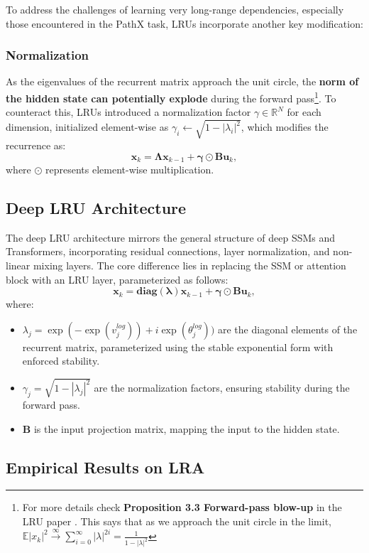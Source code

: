 \documentclass[12pt,a4paper]{report}
\begin{document}
To address the challenges of learning very long-range dependencies, especially those encountered in the PathX task, LRUs incorporate another key modification:

\subsubsection{Normalization}
As the eigenvalues of the recurrent matrix approach the unit circle, the \textbf{norm of the hidden state can potentially explode} during the forward pass\footnote{For more details check \textbf{Proposition 3.3 Forward-pass blow-up} in the LRU paper \cite{lru}. This says that as we approach the unit circle in the limit, $\mathbb{E}|x_k|^2 \xrightarrow{\infty} \sum_{i=0}^{\infty} |\lambda|^{2i} = \frac{1}{1-|\lambda|^2}$}. To counteract this, LRUs introduced a normalization factor $\gamma \in \mathbb{R}^{N}$ for each dimension, initialized element-wise as $\gamma_{i} \leftarrow \sqrt{1 - |\lambda_i|^2}$, which modifies the recurrence as:
\[\mathbf{x}_k = \mathbf{\Lambda} \mathbf{x}_{k-1} + \mathbf{\gamma} \odot \mathbf{B} \mathbf{u}_k, \]
where $\odot$ represents element-wise multiplication.

\subsection{Deep LRU Architecture}
The deep LRU architecture mirrors the general structure of deep SSMs and Transformers, incorporating residual connections, layer normalization, and non-linear mixing layers. The core difference lies in replacing the SSM or attention block with an LRU layer, parameterized as follows:
\[\mathbf{x}_{k} = \mathbf{diag(\lambda)}\mathbf{x}_{k-1} + \mathbf{\gamma} \odot \mathbf{B}\mathbf{u}_{k},\]
where:
\begin{itemize}
    \item $\lambda_j = \exp(-\exp(v_j^{log})) + i \exp(\theta_j^{log}))$ are the diagonal elements of the recurrent matrix, parameterized using the stable exponential form with enforced stability.
    \item $\gamma_j = \sqrt{1 - |\lambda_j|^{2}}$ are the normalization factors, ensuring stability during the forward pass.
    \item $\mathbf{B}$ is the input projection matrix, mapping the input to the hidden state.
\end{itemize}

\subsection{Empirical Results on LRA}
\end{document}
